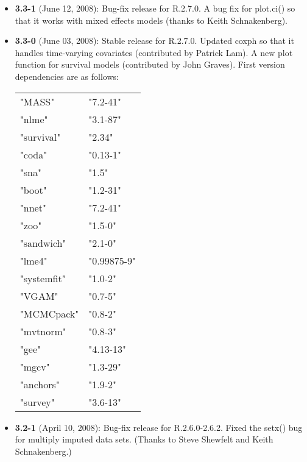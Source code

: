 \begin{itemize}
  
\item {\bf 3.3-1} (June 12, 2008): Bug-fix release for R.2.7.0. A bug
  fix for {\rm plot.ci()} so that it works with mixed effects models
  (thanks to Keith Schnakenberg).
  
\item {\bf 3.3-0} (June 03, 2008): Stable release for R.2.7.0. Updated
  {\rm coxph} so that it handles time-varying covariates (contributed
  by Patrick Lam). A new plot function for survival models
  (contributed by John Graves). First version dependencies are as
  follows: \newline
\begin{tabular}{ll}\label{table.compact}
  "MASS"     & "7.2-41" \\
  "nlme"     & "3.1-87" \\
  "survival" & "2.34"    \\
  "coda"     & "0.13-1"  \\
  "sna"      & "1.5"     \\
  "boot"     & "1.2-31"  \\
  "nnet"     & "7.2-41"  \\
  "zoo"      & "1.5-0"   \\
  "sandwich" & "2.1-0"   \\
  "lme4"     & "0.99875-9" \\
  "systemfit" & "1.0-2" \\
  "VGAM"      & "0.7-5" \\
  "MCMCpack"  & "0.8-2" \\
  "mvtnorm"   & "0.8-3" \\
  "gee"       & "4.13-13" \\
  "mgcv"      & "1.3-29" \\
  "anchors"   & "1.9-2" \\
  "survey"    & "3.6-13" 
\end{tabular}
  
\item {\bf 3.2-1} (April 10, 2008): Bug-fix release for R.2.6.0-2.6.2.
  Fixed the {\rm setx()} bug for multiply imputed data sets. (Thanks
  to Steve Shewfelt and Keith Schnakenberg.)


\end{itemize}
